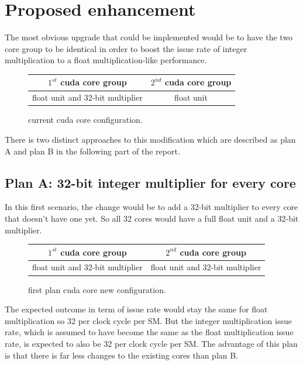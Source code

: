 \documentclass{report}
\begin{document}
   \section{Proposed enhancement}
   The most obvious upgrade that could be implemented would be to have the two core group to be identical in order to boost the issue rate of integer multiplication to a float multiplication-like performance.
   \begin{figure}[H]
      \centering
       \begin{tabular}{ | c | c | }
    	    \hline
    	    $1^{st}$ cuda core group & $2^{nd}$ cuda core group \\ \hline
    	   float unit and 32-bit multiplier & float unit \\ \hline
  	\end{tabular}
  	\captionsetup{justification=centering}
  	\caption{current cuda core configuration.}
  	\label{fig:current_cores}
   \end{figure}
   There is two distinct approaches to this modification which are described as plan A and plan B in the following part of the report.
   \subsection{Plan A: 32-bit integer multiplier for every core}
    In this first scenario, the change would be to add a 32-bit multiplier to every core that doesn't have one yet. So all 32 cores would have a full float unit and a 32-bit multiplier.
    \begin{figure}[H]
      \centering
       \begin{tabular}{ | c | c | }
    	    \hline
    	    $1^{st}$ cuda core group & $2^{nd}$ cuda core group \\ \hline
    	   float unit and 32-bit multiplier & float unit and 32-bit multiplier \\ \hline
  	\end{tabular}
  	\captionsetup{justification=centering}
  	\caption{first plan cuda core new configuration.}
  	\label{fig:plana_cores}
   \end{figure}
    The expected outcome in term of issue rate would stay the same for float multiplication so 32 per clock cycle per SM. But the integer multiplication issue rate, which is assumed to have become the same as the float multiplication issue rate, is expected to also be 32 per clock cycle per SM.
    The advantage of this plan is that there is far less changes to the existing cores than plan B.
\end{document}
